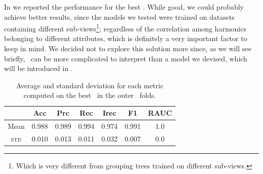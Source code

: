 In  we reported the performance for the best \rf. While good, we could probably achieve better
results, since the models we tested were trained on datasets containing different sub-views\footnote{
	Which is very different from grouping trees trained on different sub-views.
}; regardless of the correlation among harmonics belonging to different attributes, which is
definitely a very important factor to keep in mind. We decided not to explore this solution more
since, as we will see briefly, \rfs\ can be more complicated to interpret than a model we devised,
which will be introduced in .
\begin{table}[!ht]
	\caption{Average and standard deviation for each metric computed on the best \rf\ in the outer \cv\ folds.}\label{tbl:rf-cnmod-phi-perf}

	\bigskip
	\setlength{\tabcolsep}{6pt}
	\centering
	\begin{tabular}{ccccccc}
		\toprule
		\textbf{}    & \textbf{Acc} & \textbf{Prc} & \textbf{Rec} & \textbf{Irec} & \textbf{F1} & \textbf{RAUC} \\
		\midrule
		Mean         & 0.988        & 0.989        & 0.994        & 0.974         & 0.991
		             & 1.0                                                                                      \\
		\textsc{std} & 0.010        & 0.013        & 0.011        & 0.032         & 0.007
		             & 0.0                                                                                      \\
		\bottomrule
	\end{tabular}
\end{table}

